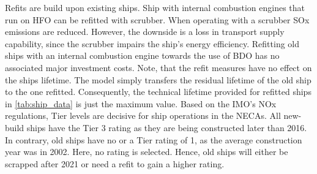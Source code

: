 \documentclass[article]{elsarticle}
\begin{document}
Refits are build upon existing ships. Ship with internal combustion engines that run on HFO can be refitted with scrubber. When operating with a scrubber SOx emissions are reduced. However, the downside is a loss in transport supply capability, since the scrubber impairs the ship's energy efficiency. Refitting old ships with an internal combustion engine towards the use of BDO has no associated major investment costs. Note, that the refit measures have no effect on the ships lifetime. The model simply transfers the residual lifetime of the old ship to the one refitted. Consequently, the technical lifetime provided for refitted ships in \cref{tab:ship_data} is just the maximum value. Based on the IMO's NOx regulations, Tier levels are decisive for ship operations in the NECAs. All new-build ships have the Tier 3 rating as they are being constructed later than 2016. In contrary, old ships have no or a Tier rating of 1, as the average construction year was in 2002. Here, no rating is selected. Hence, old ships will either be scrapped after 2021 or need a refit to gain a higher rating.
\end{document}
